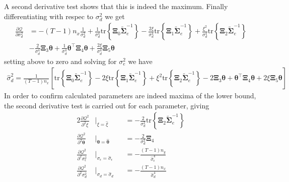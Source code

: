 \documentclass[]{article}
\begin{document}
A second derivative test shows that this is indeed the maximum. Finally differentiating with respec to $\sigma_d^2$ we get
\begin{align}
 \frac{\partial \mathcal Q}{\partial \sigma_d^2}&= -(T-1)n_x\frac{1}{\sigma_d^2}+\frac{1}{\sigma_d^4}\mathrm{tr}\left\lbrace \boldsymbol\Xi_0 \tilde{\boldsymbol\Sigma}_e^{-1}\right\rbrace-\frac{2\xi}{\sigma_d^4} \mathrm{tr}\left\lbrace \boldsymbol\Xi_1 \tilde{\boldsymbol\Sigma}_e^{-1}\right\rbrace+\frac{\xi^2}{\sigma_d^4}\mathrm{tr} \left\lbrace\boldsymbol\Xi_2\tilde{\boldsymbol\Sigma}_e^{-1} \right\rbrace  \nonumber \\
&-\frac{2}{\sigma_d^4}\boldsymbol\Xi_3\boldsymbol\theta +\frac{1}{\sigma_d^4}\boldsymbol\theta^\top \boldsymbol\Xi_4\boldsymbol\theta+\frac{2\xi}{\sigma_d^4} \boldsymbol\Xi_5 \boldsymbol\theta 
\end{align}
setting above to zero and solving for $\sigma_e^2$ we have
\begin{align}
\hat{\sigma}_d^2=\frac{1}{(T-1)n_x}\left[ \mathrm{tr}\left\lbrace \boldsymbol\Xi_0 \tilde{\boldsymbol\Sigma}_e^{-1}\right\rbrace-
2\xi\mathrm{tr}\left\lbrace \boldsymbol\Xi_1 \tilde{\boldsymbol\Sigma}_e^{-1}\right\rbrace +\xi^2\mathrm{tr} \left\lbrace\boldsymbol\Xi_2\tilde{\boldsymbol\Sigma}_e^{-1}\right\rbrace -2\boldsymbol\Xi_3\boldsymbol\theta+\boldsymbol\theta^\top\boldsymbol \Xi_4\boldsymbol\theta+2\xi\boldsymbol\Xi_5 \boldsymbol\theta\right]  
\end{align}
In order to confirm calculated parameters are indeed maxima of the lower bound, the second derivative test is carried out for each parameter, giving
\begin{alignat}{2}%
 \frac{\partial \mathcal Q^2}{\partial^2\xi}&\biggr\rvert_{\xi=\hat{\xi}}&&=-\frac{2}{\sigma_d^2}\mathrm{tr}\left\lbrace \boldsymbol\Xi_2 \tilde{\boldsymbol\Sigma}_e^{-1}\right\rbrace \label{eq:SecondDerivativexi}\\
 \frac{\partial \mathcal Q^2}{\partial^2\boldsymbol\theta}&\biggr\rvert_{\boldsymbol\theta=\hat{\boldsymbol\theta}}&&=-\frac{2}{\sigma_d^2}\boldsymbol\Xi_4 \label{eq:SecondDerivativetheta} \\
 \frac{\partial \mathcal Q^2}{\partial^2\sigma_{\epsilon}^2}&\biggr\rvert_{\sigma_{\epsilon}=\hat{\sigma}_{\epsilon}}&&=-\frac{(T-1)n_y}{\hat{\sigma}_{\epsilon}^4} \label{eq:SecondDerivativenoise} \\
 \frac{\partial \mathcal Q^2}{\partial^2\sigma_{d}^2}&\biggr\rvert_{{\sigma}_{d}=\hat{\sigma}_{d}}&&= -\frac{(T-1)n_x}{\hat{\sigma}_{d}^4} \label{eq:SecondDerivativedisturbance}
\end{alignat}
\end{document}
